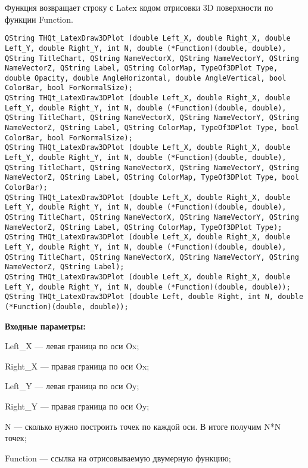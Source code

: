 \documentclass[a4paper,12pt]{article}
\begin{document}
Функция возвращает строку с Latex кодом отрисовки 3D поверхности по функции Function.


\begin{lstlisting}[label=code_syntax_THQt_LatexDraw3DPlot,caption=Синтаксис]
QString THQt_LatexDraw3DPlot (double Left_X, double Right_X, double Left_Y, double Right_Y, int N, double (*Function)(double, double),  QString TitleChart, QString NameVectorX, QString NameVectorY, QString NameVectorZ, QString Label, QString ColorMap, TypeOf3DPlot Type, double Opacity, double AngleHorizontal, double AngleVertical, bool ColorBar, bool ForNormalSize);
QString THQt_LatexDraw3DPlot (double Left_X, double Right_X, double Left_Y, double Right_Y, int N, double (*Function)(double, double),  QString TitleChart, QString NameVectorX, QString NameVectorY, QString NameVectorZ, QString Label, QString ColorMap, TypeOf3DPlot Type, bool ColorBar, bool ForNormalSize);
QString THQt_LatexDraw3DPlot (double Left_X, double Right_X, double Left_Y, double Right_Y, int N, double (*Function)(double, double),  QString TitleChart, QString NameVectorX, QString NameVectorY, QString NameVectorZ, QString Label, QString ColorMap, TypeOf3DPlot Type, bool ColorBar);
QString THQt_LatexDraw3DPlot (double Left_X, double Right_X, double Left_Y, double Right_Y, int N, double (*Function)(double, double),  QString TitleChart, QString NameVectorX, QString NameVectorY, QString NameVectorZ, QString Label, QString ColorMap, TypeOf3DPlot Type);
QString THQt_LatexDraw3DPlot (double Left_X, double Right_X, double Left_Y, double Right_Y, int N, double (*Function)(double, double),  QString TitleChart, QString NameVectorX, QString NameVectorY, QString NameVectorZ, QString Label);
QString THQt_LatexDraw3DPlot (double Left_X, double Right_X, double Left_Y, double Right_Y, int N, double (*Function)(double, double));
QString THQt_LatexDraw3DPlot (double Left, double Right, int N, double (*Function)(double, double));
\end{lstlisting}

\textbf{Входные параметры:}

Left\_X --- левая граница по оси Ox;
 
    Right\_X --- правая граница по оси Ox;
 
    Left\_Y --- левая граница по оси Oy;
 
    Right\_Y --- правая граница по оси Oy;
 
    N --- сколько нужно построить точек по каждой оси. В итоге получим N*N точек;
 
    Function --- ссылка на отрисовываемую двумерную функцию;
 
\end{document}
